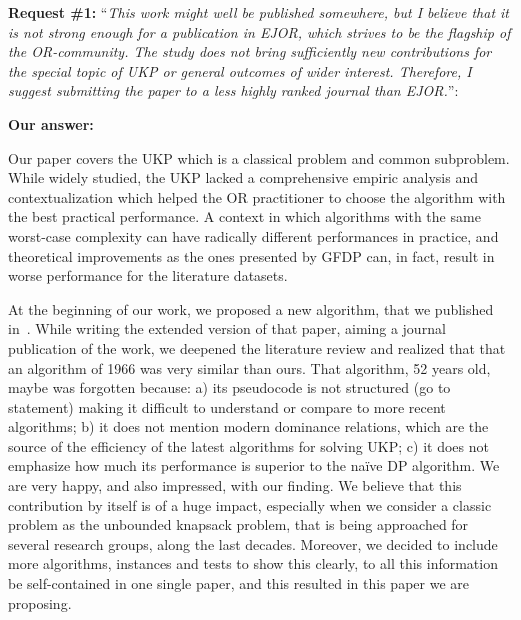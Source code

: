 \documentclass{elsarticle}
\begin{document}
\textbf{Request \#1:} ``\textit{This work might well be published somewhere, but I believe that it is not strong enough for a publication in EJOR, which strives to be the flagship of the OR-community. The study does not bring sufficiently new contributions for the special topic of UKP or general outcomes of wider interest. Therefore, I suggest submitting the paper to a less highly ranked journal than EJOR.}'':

\textbf{Our answer:} 

Our paper covers the UKP which is a classical problem and common subproblem.
While widely studied, the UKP lacked a comprehensive empiric analysis and contextualization which helped the OR practitioner to choose the algorithm with the best practical performance.
A context in which algorithms with the same worst-case complexity can have radically different performances in practice, and theoretical improvements as the ones presented by GFDP can, in fact, result in worse performance for the literature datasets.

At the beginning of our work, we proposed a new algorithm, that we published in~\cite{sea2016}.
While writing the extended version of that paper, aiming a journal publication of the work, we deepened the literature review and realized that that an algorithm of 1966 was very similar than ours.
That algorithm, 52 years old, maybe was forgotten because: a) its pseudocode is not structured (go to statement) making it difficult to understand or compare to more recent algorithms; b) it does not mention modern dominance relations, which are the source of the efficiency of the latest algorithms for solving UKP; c) it does not emphasize how much its performance is superior to the naïve DP algorithm.
We are very happy, and also impressed, with our finding.
We believe that this contribution by itself is of a huge impact, especially when we consider a classic problem as the unbounded knapsack problem, that is being approached for several research groups, along the last decades. 
Moreover, we decided to include more algorithms, instances and tests to show this clearly, to all this information be self-contained in one single paper, and this resulted in this paper we are proposing.
\end{document}
